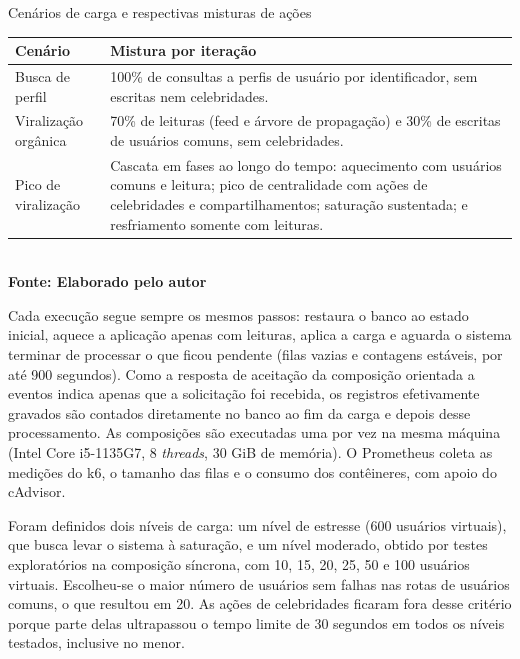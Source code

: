 \begin{quadro}[H]
    \centering
    \caption{Cenários de carga e respectivas misturas de ações}
    \label{qua:cenarios}
    \begin{tabular}{|C{2.4cm}|C{12.6cm}|}
    \hline
    \textbf{Cenário} & \textbf{Mistura por iteração} \\ \hline
    Busca de perfil & 100\% de consultas a perfis de usuário por identificador, sem escritas nem celebridades. \\ \hline
    Viralização orgânica & 70\% de leituras (feed e árvore de propagação) e 30\% de escritas de usuários comuns, sem celebridades. \\ \hline
    Pico de viralização & Cascata em fases ao longo do tempo: aquecimento com usuários comuns e leitura; pico de centralidade com ações de celebridades e compartilhamentos; saturação sustentada; e resfriamento somente com leituras. \\ \hline
    \end{tabular}
    \vspace{.1cm}
    \small
    {\footnotesize\\ \textbf{Fonte: Elaborado pelo autor}}
\end{quadro}

Cada execução segue sempre os mesmos passos: restaura o banco ao estado inicial, aquece a aplicação apenas com leituras, aplica a carga e aguarda o sistema terminar de processar o que ficou pendente (filas vazias e contagens estáveis, por até 900 segundos). Como a resposta de aceitação da composição orientada a eventos indica apenas que a solicitação foi recebida, os registros efetivamente gravados são contados diretamente no banco ao fim da carga e depois desse processamento. As composições são executadas uma por vez na mesma máquina (Intel Core i5-1135G7, 8 \textit{threads}, 30 GiB de memória). O Prometheus coleta as medições do k6, o tamanho das filas e o consumo dos contêineres, com apoio do cAdvisor.

Foram definidos dois níveis de carga: um nível de estresse (600 usuários virtuais), que busca levar o sistema à saturação, e um nível moderado, obtido por testes exploratórios na composição síncrona, com 10, 15, 20, 25, 50 e 100 usuários virtuais. Escolheu-se o maior número de usuários sem falhas nas rotas de usuários comuns, o que resultou em 20. As ações de celebridades ficaram fora desse critério porque parte delas ultrapassou o tempo limite de 30 segundos em todos os níveis testados, inclusive no menor.


